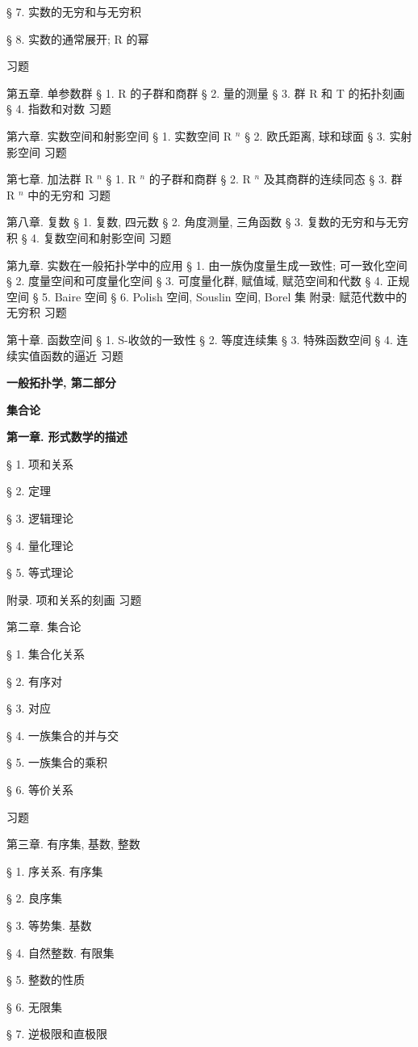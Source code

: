 § 7. 实数的无穷和与无穷积

§ 8. 实数的通常展开; R 的幂

习题

第五章. 单参数群 § 1. R 的子群和商群 § 2. 量的测量 § 3. 群 R 和 T 的拓扑刻画 § 4. 指数和对数 习题

第六章. 实数空间和射影空间 § 1. 实数空间 R \(^{n}\) § 2. 欧氏距离, 球和球面 § 3. 实射影空间 习题

第七章. 加法群 R \(^{n}\) § 1. R \(^{n}\) 的子群和商群 § 2. R \(^{n}\) 及其商群的连续同态 § 3. 群 R \(^{n}\) 中的无穷和 习题

第八章. 复数 § 1. 复数, 四元数 § 2. 角度测量, 三角函数 § 3. 复数的无穷和与无穷积 § 4. 复数空间和射影空间 习题

第九章. 实数在一般拓扑学中的应用 § 1. 由一族伪度量生成一致性; 可一致化空间 § 2. 度量空间和可度量化空间 § 3. 可度量化群, 赋值域, 赋范空间和代数 § 4. 正规空间 § 5. Baire 空间 § 6. Polish 空间, Souslin 空间, Borel 集 附录: 赋范代数中的无穷积 习题

第十章. 函数空间 § 1. S-收敛的一致性 § 2. 等度连续集 § 3. 特殊函数空间 § 4. 连续实值函数的逼近 习题

\textbf{一般拓扑学, 第二部分}

\textbf{集合论}

\textbf{第一章. 形式数学的描述}

§ 1. 项和关系

§ 2. 定理

§ 3. 逻辑理论

§ 4. 量化理论

§ 5. 等式理论

附录. 项和关系的刻画 习题

第二章. 集合论

§ 1. 集合化关系

§ 2. 有序对

§ 3. 对应

§ 4. 一族集合的并与交

§ 5. 一族集合的乘积

§ 6. 等价关系

习题

第三章. 有序集, 基数, 整数

§ 1. 序关系. 有序集

§ 2. 良序集

§ 3. 等势集. 基数

§ 4. 自然整数. 有限集

§ 5. 整数的性质

§ 6. 无限集

§ 7. 逆极限和直极限

